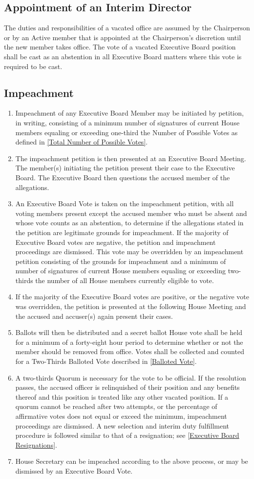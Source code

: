 \documentclass{article}
\newcommand{\asection}[1]{\subsection{#1} \label{#1}}
\begin{document}
\asection{Appointment of an Interim Director}
The duties and responsibilities of a vacated office are assumed by the Chairperson or by an Active member that is appointed at the Chairperson's discretion until the new member takes office.
The vote of a vacated Executive Board position shall be cast as an abstention in all Executive Board matters where this vote is required to be cast.

\asection{Impeachment}
\begin{enumerate}
	\item Impeachment of any Executive Board Member may be initiated by petition, in writing, consisting of a minimum number of signatures of current House members equaling or exceeding one-third the Number of Possible Votes as defined in \ref{Total Number of Possible Votes}.
	\item The impeachment petition is then presented at an Executive Board Meeting.
		The member(s) initiating the petition present their case to the Executive Board.
		The Executive Board then questions the accused member of the allegations.
	\item An Executive Board Vote is taken on the impeachment petition, with all voting members present except the accused member who must be absent and whose vote counts as an abstention, to determine if the allegations stated in the petition are legitimate grounds for impeachment.
		If the majority of Executive Board votes are negative, the petition and impeachment proceedings are dismissed.
		This vote may be overridden by an impeachment petition consisting of the grounds for impeachment and a minimum of number of signatures of current House members equaling or exceeding two-thirds the number of all House members currently eligible to vote.
	\item If the majority of the Executive Board votes are positive, or the negative vote was overridden, the petition is presented at the following House Meeting and the accused and accuser(s) again present their cases.
	\item Ballots will then be distributed and a secret ballot House vote shall be held for a minimum of a forty-eight hour period to determine whether or not the member should be removed from office.
		Votes shall be collected and counted for a Two-Thirds Balloted Vote described in \ref{Balloted Vote}.
	\item A two-thirds Quorum is necessary for the vote to be official.
		If the resolution passes, the accused officer is relinquished of their position and any benefits thereof and this position is treated like any other vacated position.
		If a quorum cannot be reached after two attempts, or the percentage of affirmative votes does not equal or exceed the minimum, impeachment proceedings are dismissed.
		A new selection and interim duty fulfillment procedure is followed similar to that of a resignation; see \ref{Executive Board Resignations}.
	\item House Secretary can be impeached according to the above process, or may be dismissed by an Executive Board Vote.
\end{enumerate}
\end{document}
